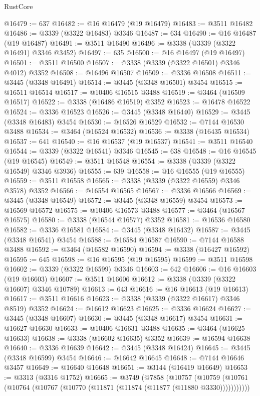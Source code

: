 \begin{lexlean}{RustCore}
\begin{coremodule}
@16479 := 637
@16482 := @16 @16479 (@19 @16479)
@16483 := @3511 @16482
@16486 := @3339 (@3322 @16483) @3346
@16487 := 634
@16490 := @16 @16487 (@19 @16487)
@16491 := @3511 @16490
@16496 := @3338 (@3339 (@3322 @16491) @3346 @3452)
@16497 := 635
@16500 := @16 @16497 (@19 @16497)
@16501 := @3511 @16500
@16507 := @3338 (@3339 (@3322 @16501) @3346 @4012) @3352
@16508 := @16496 @16507
@16509 := @3336 @16508
@16511 := @3445 (@3348 @16491)
@16514 := @3445 (@3348 @16501) @3454
@16515 := @16511 @16514
@16517 := @10406 @16515 @3488
@16519 := @3464 (@16509 @16517)
@16522 := @3338 (@16486 @16519) @3352
@16523 := @16478 @16522
@16524 := @3336 @16523
@16526 := @3445 (@3348 @16440)
@16529 := @3445 (@3348 @16483) @3454
@16530 := @16526 @16529
@16532 := @7144 @16530 @3488
@16534 := @3464 (@16524 @16532)
@16536 := @3338 (@16435 @16534)
@16537 := 641
@16540 := @16 @16537 (@19 @16537)
@16541 := @3511 @16540
@16544 := @3339 (@3322 @16541) @3346
@16545 := 638
@16548 := @16 @16545 (@19 @16545)
@16549 := @3511 @16548
@16554 := @3338 (@3339 (@3322 @16549) @3346 @3936)
@16555 := 639
@16558 := @16 @16555 (@19 @16555)
@16559 := @3511 @16558
@16565 := @3338 (@3339 (@3322 @16559) @3346 @3578) @3352
@16566 := @16554 @16565
@16567 := @3336 @16566
@16569 := @3445 (@3348 @16549)
@16572 := @3445 (@3348 @16559) @3454
@16573 := @16569 @16572
@16575 := @10406 @16573 @3488
@16577 := @3464 (@16567 @16575)
@16580 := @3338 (@16544 @16577) @3352
@16581 := @16536 @16580
@16582 := @3336 @16581
@16584 := @3445 (@3348 @16432)
@16587 := @3445 (@3348 @16541) @3454
@16588 := @16584 @16587
@16590 := @7144 @16588 @3488
@16592 := @3464 (@16582 @16590)
@16594 := @3338 (@16427 @16592)
@16595 := 645
@16598 := @16 @16595 (@19 @16595)
@16599 := @3511 @16598
@16602 := @3339 (@3322 @16599) @3346
@16603 := 642
@16606 := @16 @16603 (@19 @16603)
@16607 := @3511 @16606
@16612 := @3338 (@3339 (@3322 @16607) @3346 @10789)
@16613 := 643
@16616 := @16 @16613 (@19 @16613)
@16617 := @3511 @16616
@16623 := @3338 (@3339 (@3322 @16617) @3346 @8519) @3352
@16624 := @16612 @16623
@16625 := @3336 @16624
@16627 := @3445 (@3348 @16607)
@16630 := @3445 (@3348 @16617) @3454
@16631 := @16627 @16630
@16633 := @10406 @16631 @3488
@16635 := @3464 (@16625 @16633)
@16638 := @3338 (@16602 @16635) @3352
@16639 := @16594 @16638
@16640 := @3336 @16639
@16642 := @3445 (@3348 @16424)
@16645 := @3445 (@3348 @16599) @3454
@16646 := @16642 @16645
@16648 := @7144 @16646 @3457
@16649 := @16640 @16648
@16651 := @3144 (@16419 @16649)
@16653 := @3313 (@3316 @1752)
@16665 := @3749
    (@7858
      (@10757
        (@10759 (@10761 (@10764 (@10767 (@10770 (@11871 (@11874 (@11877 (@11880 @3330)))))))))))

\end{coremodule}
\end{lexlean}
